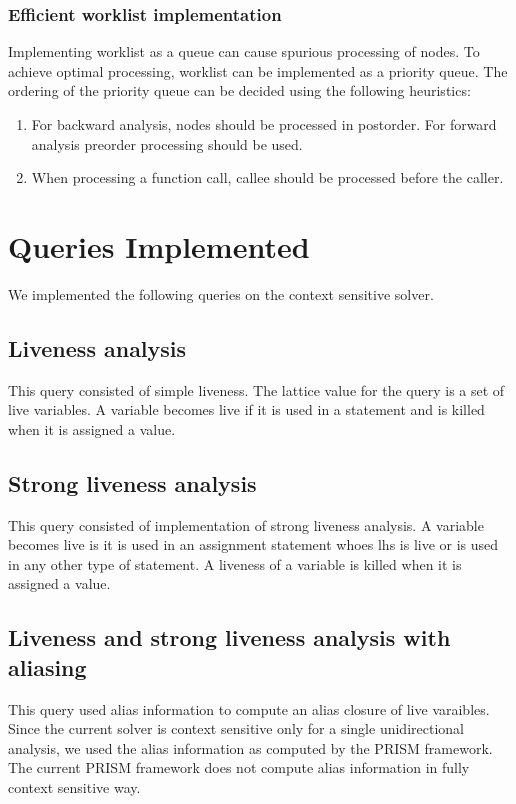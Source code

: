 \documentclass[12pt]{report}
\begin{document}
\subsubsection{Efficient worklist implementation}

Implementing worklist as a queue can cause spurious processing of nodes. To achieve optimal processing, worklist can be implemented as a priority queue. The ordering of the priority queue can be decided using the following heuristics:

\begin{enumerate}
\item For backward analysis, nodes should be processed in postorder. For forward analysis preorder processing should be used.
\item When processing a function call, callee should be processed before the caller.
\end{enumerate}

\section{Queries Implemented}
We implemented the following queries on the context sensitive solver.
\subsection{Liveness analysis}
This query consisted of simple liveness. The lattice value for the query is a set of live variables. A variable becomes live if it is used in a statement and is killed when it is assigned a value.

\subsection{Strong liveness analysis}
This query consisted of implementation of strong liveness analysis. A variable becomes live is it is used in an assignment statement whoes lhs is live or is used in any other type of statement. A liveness of a variable is killed when it is assigned a value.

\subsection{Liveness and strong liveness analysis with aliasing}
This query used alias information to compute an alias closure of live varaibles. Since the current solver is context sensitive only for a single unidirectional analysis, we used the alias information as computed by the PRISM framework. The current PRISM framework does not compute alias information in fully context sensitive way.
\end{document}
